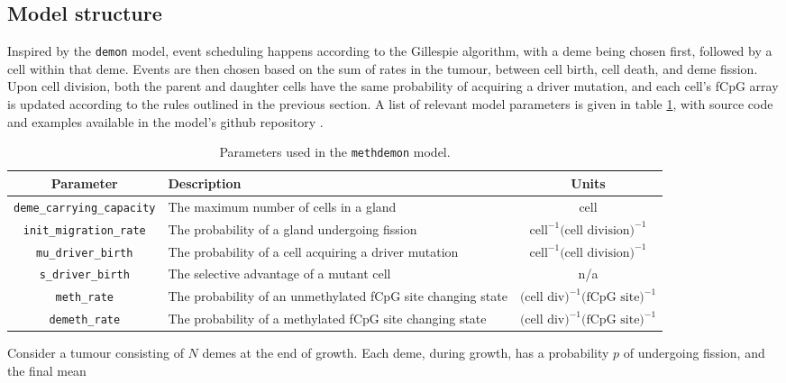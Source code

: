 \subsection{Model structure}
Inspired by the \texttt{demon} model, event scheduling happens according to the
Gillespie algorithm, with a deme being chosen first, followed by a cell within
that deme. Events are then chosen based on the sum of rates in the tumour,
between cell birth, cell death, and deme fission. Upon cell division, both the
parent and daughter cells have the same probability of acquiring a driver
mutation, and each cell's fCpG array is updated according to the rules outlined
in the previous section. A list of relevant model parameters is given in table
\ref{table:methdemon_params}, with source code and examples available in the
model's github repository \cite{manojlovic_vesmanojlovicmethdemon_2023}.
\begin{table}[h]
    \centering
    \begin{tabularx}{\textwidth}{|c|X|c|}
        \hline
        Parameter & Description & Units \\
        \hline
        \texttt{deme\_carrying\_capacity} & The maximum number of cells in a
        gland & cell \\
        \hline
        \texttt{init\_migration\_rate} & The probability of a gland undergoing
        fission & $\text{cell}^{-1}\text{(cell division)}^{-1}$\\
        \hline
        \texttt{mu\_driver\_birth} & The probability of a cell acquiring a
        driver mutation & $\text{cell}^{-1}\text{(cell division)}^{-1}$ \\
        \hline
        \texttt{s\_driver\_birth} & The selective advantage of a mutant
        cell & n/a \\
        \hline
        \texttt{meth\_rate} & The probability of an unmethylated fCpG site
        changing state & $\text{(cell div)}^{-1}\text{(fCpG site)}^{-1}$\\
        \hline
        \texttt{demeth\_rate} & The probability of a methylated fCpG site
        changing state & $\text{(cell div)}^{-1}\text{(fCpG site)}^{-1}$\\
        \hline
    \end{tabularx}
    \caption{Parameters used in the \texttt{methdemon} model.}
    \label{table:methdemon_params}
\end{table}
 Consider a tumour consisting of $N$ demes at the end of growth. Each deme,
 during growth, has a probability $p$ of undergoing fission, and the final mean
